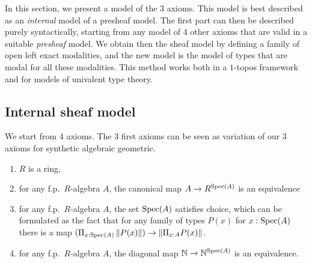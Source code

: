 \newcommand{\inc}{\mathsf{inc}}
\newcommand{\inl}{\mathsf{inl}}
\newcommand{\inr}{\mathsf{inr}}
\newcommand{\idd}{\mathsf{id}}
\newcommand{\II}{\mathbf{I}}
\newcommand{\nats}{\mathbb{N}}
\newcommand\norm[1]{\left\lVert #1 \right\rVert}


\newcommand{\Gm}{\mathsf{G_m}}
\newcommand{\ext}{\mathsf{ext}}
\newcommand{\patch}{\mathsf{patch}}
\newcommand{\cov}{\mathsf{cov}}
\newcommand{\isSheaf}{\mathsf{isSheaf}}
\newcommand{\isIso}{\mathsf{isIso}}
\newcommand{\Fib}{\mathsf{Fib}}

\newcommand{\Typp}{\mathsf{Type}}
\newcommand{\Elem}{\mathsf{Elem}}
\newcommand{\Cont}{\mathsf{Cont}}

\newcommand{\BB}{\mathcal{B}}
\newcommand{\CC}{\mathcal{C}}
\newcommand{\UU}{\mathcal{U}}
\newcommand{\WW}{\mathcal{W}}
\newcommand{\VV}{\mathcal{V}}

In this section, we present a model of the 3 axioms. This model is best described as an \emph{internal} model
of a presheaf model. The first part can then be described purely syntactically, starting from any model
of 4 other axioms that are valid in a suitable \emph{presheaf} model. We obtain then the sheaf model by defining
a family of open left exact modalities, and the new model is the model of types that are modal for all these modalities.
This method works both in a $1$-topos framework and for models of univalent type theory.

\subsection{Internal sheaf model}

We start from 4 axioms. The 3 first axioms can be seen as variation of our 3 axioms for synthetic algebraic geometric.

\begin{enumerate}[(1)]
\item $R$ is a ring,
\item for any f.p.\ $R$-algebra $A$, the canonical map $A\rightarrow R^{\operatorname{Spec}(A)}$ is an equivalence
\item for any f.p.\ $R$-algebra $A$, the set $\operatorname{Spec}(A)$ satisfies choice, which can be formulated as
  the fact that for any family of types $P(x)$ for $x:\operatorname{Spec}(A)$ there is a map
  $(\Pi_{x:\Spec(A)}\norm{P(x)})\rightarrow \norm{\Pi_{x:A}P(x)}$.
\item for any f.p.\ $R$-algebra $A$, the diagonal map $\nats\rightarrow\nats^{\Spec(A)}$ is an equivalence.
  
\end{enumerate}

